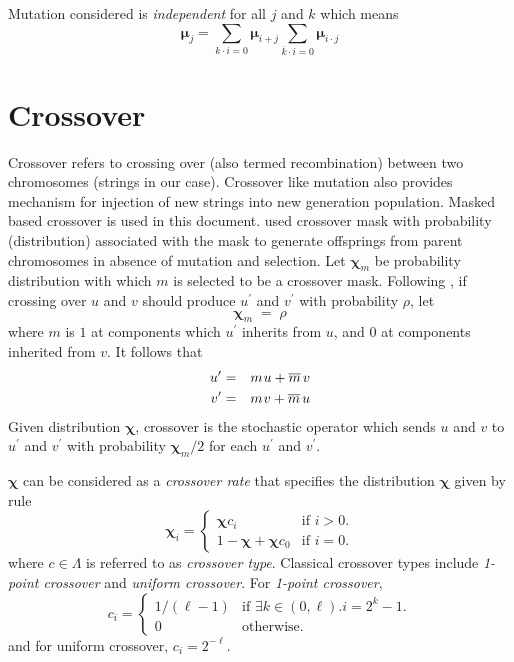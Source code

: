 Mutation considered is {\em independent} for all $j$ and $k$ which means \cite{VoseWright1998}
\[
\bm{\mu}_j = \sum\limits_{k\cdot i=0} \bm{\mu}_{i + j} \sum\limits_{\overline{k} \cdot i=0} \bm{\mu}_{i\cdot j}
\]

\section{Crossover}
Crossover refers to crossing over (also termed recombination) between two chromosomes (strings in our case). Crossover like mutation also provides mechanism for injection of new strings into new generation population. Masked based crossover is used in this document. \cite{Geiringer1944} used crossover mask with probability (distribution) associated with the mask to generate offsprings from parent chromosomes in absence of mutation and selection. Let $\bm{\chi}_m$ be probability distribution with which $m$ is selected to be a crossover mask.
Following \cite{Geiringer1944}, if crossing over $u$ and $v$ should produce $u^\prime$ and $v^\prime$ with probability $\rho$, let
\[
\bm{\chi}_m \; = \; \rho
\]
where $m$ is $1$ at components which $u^\prime$ inherits from $u$, and
$0$ at components inherited from $v$.  It follows that\\[-0.3in]
\begin{eqnarray*}
u^\prime & = & m \nudge u + \overline{m} \nudge\nudge v \\
v^\prime & = & m \nudge v + \overline{m} \nudge\nudge u
\end{eqnarray*}
Given distribution $\bm{\chi}$, crossover is the stochastic operator which
sends $u$ and $v$ to $u^\prime$ and $v^\prime$ with probability $\bm{\chi}_m/2$ for each $u^\prime$ and $v^\prime$.

$\bm{\chi}$ can be considered as a {\em crossover rate} that specifies the distribution $\bm{\chi}$ given by rule \cite{VoseWright1998}
\[
  \bm{\chi}_i =\begin{cases}
    \bm{\chi}  c_i & \text{if $i>0$}.\\
    1 - \bm{\chi} + \bm{\chi}  c_0 & \text{if $i = 0$}.
  \end{cases}
\]
where $c \in \Lambda$ is referred to as {\em crossover type}. Classical crossover types include {\em 1-point crossover} and {\em uniform crossover}. For {\em 1-point crossover},
\[
  c_i =\begin{cases}
    1/(\ell - 1) & \text{if $\exists k \in (0, \ell).i = 2^k - 1$}.\\
    0 & \text{otherwise}.
  \end{cases}
\]
and for uniform crossover, $c_i = 2^{-\ell}$.

